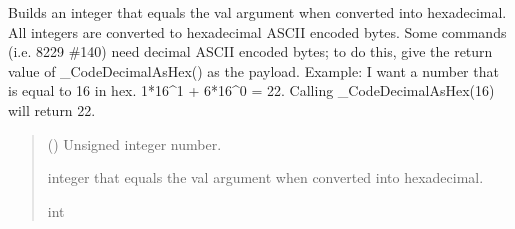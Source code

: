 \documentclass[letterpaper,10pt,english]{sphinxmanual}
\begin{document}
\begin{fulllineitems}
\begin{fulllineitems}
\begin{quote}
\begin{description}
\end{description}\end{quote}

\end{fulllineitems}


\begin{fulllineitems}
\label{\detokenize{PodDevice_8229:PodDevice_8229.POD_8229._CodeDecimalAsHex}}
\pysigstartsignatures
{}
\pysigstopsignatures
\sphinxAtStartPar
Builds an integer that equals the val argument when converted into hexadecimal.         All integers are converted to hexadecimal ASCII encoded bytes. Some commands         (i.e. 8229 \#140) need decimal ASCII encoded bytes; to do this, give the return         value of \_CodeDecimalAsHex() as the payload. Example: I want a number that is         equal to 16 in hex. 1*16\textasciicircum{}1 + 6*16\textasciicircum{}0 = 22. Calling \_CodeDecimalAsHex(16) will         return 22.
\begin{quote}\begin{description}
\sphinxAtStartPar
{} () \textendash{} Unsigned integer number.

\sphinxAtStartPar
integer that equals the val argument when converted into hexadecimal.

\sphinxAtStartPar
int

\end{description}\end{quote}

\end{fulllineitems}



\end{fulllineitems}
\end{document}
